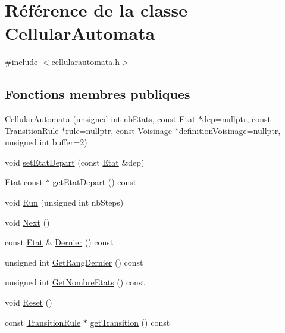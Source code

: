 \hypertarget{class_cellular_automata}{}\section{Référence de la classe Cellular\+Automata}
\label{class_cellular_automata}


{\ttfamily \#include $<$cellularautomata.\+h$>$}

\subsection*{Fonctions membres publiques}
\begin{DoxyCompactItemize}
\item 
\mbox{\hyperlink{class_cellular_automata_af50a5ecce37ce634058c6cd8724f6732}{Cellular\+Automata}} (unsigned int nb\+Etats, const \mbox{\hyperlink{class_etat}{Etat}} $\ast$dep=nullptr, const \mbox{\hyperlink{class_transition_rule}{Transition\+Rule}} $\ast$rule=nullptr, const \mbox{\hyperlink{class_voisinage}{Voisinage}} $\ast$definition\+Voisinage=nullptr, unsigned int buffer=2)
\item 
void \mbox{\hyperlink{class_cellular_automata_a8ee6a9ee70fccd7987805e3d176fb3e1}{set\+Etat\+Depart}} (const \mbox{\hyperlink{class_etat}{Etat}} \&dep)
\item 
\mbox{\hyperlink{class_etat}{Etat}} const  $\ast$ \mbox{\hyperlink{class_cellular_automata_a28ebffd21b4b0f297a0ceea6f8648421}{get\+Etat\+Depart}} () const
\item 
void \mbox{\hyperlink{class_cellular_automata_aa704c475e0501f7db1f3bcb88211493a}{Run}} (unsigned int nb\+Steps)
\item 
void \mbox{\hyperlink{class_cellular_automata_acfc9ced987c630324dcd70ceea348148}{Next}} ()
\item 
const \mbox{\hyperlink{class_etat}{Etat}} \& \mbox{\hyperlink{class_cellular_automata_a42291e2737e23c206e44f074d13323f7}{Dernier}} () const
\item 
unsigned int \mbox{\hyperlink{class_cellular_automata_a2c7e3542b8360a97f0166b5b75a11125}{Get\+Rang\+Dernier}} () const
\item 
unsigned int \mbox{\hyperlink{class_cellular_automata_a50fd8f8ee143b72c09107553d7ae04c8}{Get\+Nombre\+Etats}} () const
\item 
void \mbox{\hyperlink{class_cellular_automata_a0cbefb6072fea0aeb9458d81167c84d5}{Reset}} ()
\item 
const \mbox{\hyperlink{class_transition_rule}{Transition\+Rule}} $\ast$ \mbox{\hyperlink{class_cellular_automata_a75397ff49dc3b2042d922c2da9d7bf85}{get\+Transition}} () const

\end{DoxyCompactItemize}
